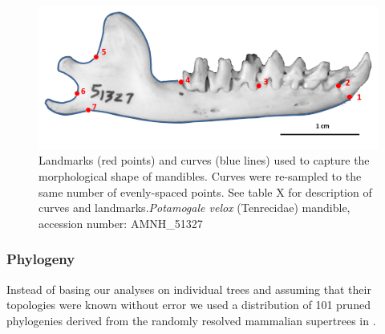 \documentclass[12pt,a4paper]{article}
\begin{document}
	\begin{table}[H]			
	\centering
	\caption{Descriptions of the landmarks (points) and curves (semilandmarks) for the skulls in dorsal view (see Figure \ref{fig:skdors_landmarks}).}
	\label{tab:skdors_landmarks}  
	\end{table}

	\begin{figure}[H]
	\centering
	\includegraphics[width=1\linewidth]{figures/AMNH_51327_landmarksdiagram.png}
	\caption{Landmarks (red points) and curves (blue lines) used to capture the morphological shape of mandibles. Curves were re-sampled to the same number of evenly-spaced points. See table X for description of curves and landmarks.\textit{Potamogale velox} (Tenrecidae) mandible, accession number: AMNH\_51327}
	\label{fig:mands_landmarks}
	\end{figure}

	\begin{table}[H]			
	\centering
	\caption{Descriptions of the landmarks (points) and curves (semilandmarks) for the mandibles in lateral (buccal) view (see figure \ref{fig:mands_landmarks})}
	
	\label{tab:mands_landmarks} %
	\end{table}

\subsubsection{Phylogeny} 
	Instead of basing our analyses on individual trees and assuming that their topologies were known without error \citep[e.g.][]{Ruta2013, Foth2012, Brusatte2008, Harmon2003} we used a distribution of 101 pruned phylogenies derived from the randomly resolved mammalian supertrees in \citep{Kuhn2011}. 
\end{document}
